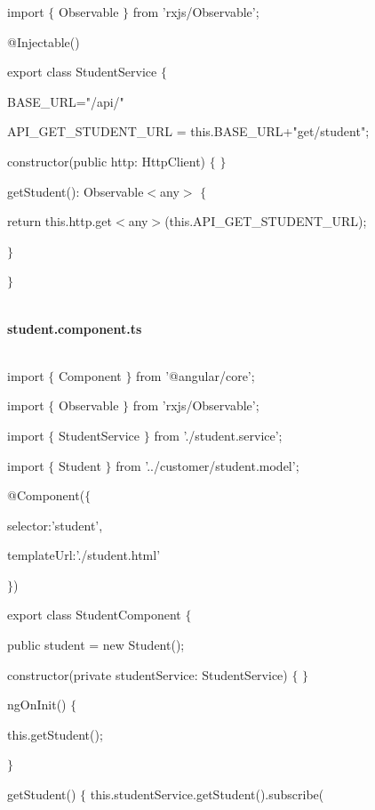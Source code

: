 \documentclass{article}
\begin{document}
\noindent import $\mathrm{\{}$ Observable $\mathrm{\}}$ from 'rxjs/Observable';

\noindent @Injectable()

\noindent export class StudentService $\mathrm{\{}$

\noindent BASE\_URL="/api/"

\noindent API\_GET\_STUDENT\_URL = this.BASE\_URL+"get/student";

\noindent constructor(public http: HttpClient) $\mathrm{\{}$ $\mathrm{\}}$

\noindent getStudent(): Observable$\mathrm{<}$any$\mathrm{>}$ $\mathrm{\{}$

\noindent return this.http.get$\mathrm{<}$any$\mathrm{>}$(this.API\_GET\_STUDENT\_URL);

\noindent $\mathrm{\}}$

\noindent $\mathrm{\}}$

 

\noindent \\ \textbf{student.component.ts}

 

\noindent \\ import $\mathrm{\{}$ Component $\mathrm{\}}$ from '@angular/core';

\noindent import $\mathrm{\{}$ Observable $\mathrm{\}}$ from 'rxjs/Observable';

\noindent import $\mathrm{\{}$ StudentService $\mathrm{\}}$ from './student.service';

\noindent import $\mathrm{\{}$ Student $\mathrm{\}}$ from '../customer/student.model';

\noindent @Component($\mathrm{\{}$

\noindent selector:'student',

\noindent templateUrl:'./student.html'

\noindent $\mathrm{\}}$)

\noindent export class StudentComponent $\mathrm{\{}$

\noindent public student = new Student();

\noindent constructor(private studentService: StudentService) $\mathrm{\{}$ $\mathrm{\}}$

\noindent ngOnInit() $\mathrm{\{}$

\noindent this.getStudent();

\noindent $\mathrm{\}}$

\noindent  getStudent() $\mathrm{\{}$ this.studentService.getStudent().subscribe(
\end{document}
